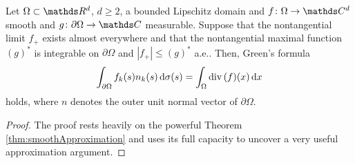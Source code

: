 \begin{prop}
  \label{prop:approximationArgument}
  Let $\Omega \subset \R^d$, $d \geq 2$, a bounded Lipschitz domain and $f \colon \Omega \to \C^d$ smooth and $g \colon \partial\Omega \to \C$ measurable.
  Suppose that the nontangential limit $f_+$ exists almost everywhere and that the nontangential maximal function $(g)^*$ is integrable on $\partial\Omega$ and $|f_+| \leq (g)^*$ a.e..
  Then, Green's formula
  \begin{align}
    \int_{\partial\Omega} f_k(s) n_k(s) \, {\operatorname{d}\!{\sigma}}(s) = \int_\Omega \mathrm{div\,} (f)(x) \, {\operatorname{d}\!{x}}
  \end{align}
  holds, where $n$ denotes the outer unit normal vector of $\partial\Omega$.
\end{prop}

\begin{proof}
  The proof rests heavily on the powerful Theorem \ref{thm:smoothApproximation} and uses its full capacity to uncover a very useful approximation argument.


\end{proof}
